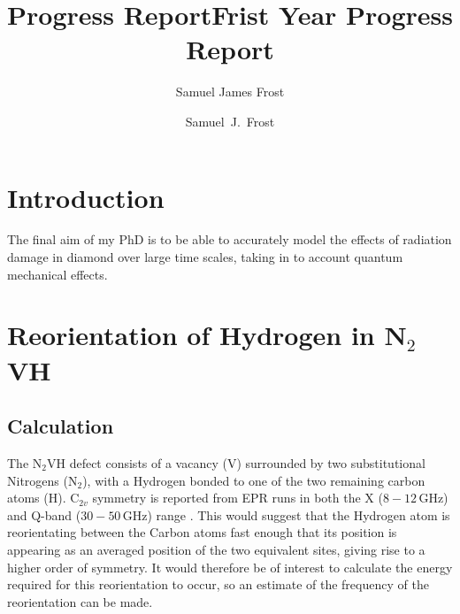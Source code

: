 \documentclass[10pt,a4paper,twocolumn,twoside]{extarticle}
\title{Progress Report}
\author{Samuel James Frost}
\title{Frist Year Progress Report}
\author{Samuel~J.~Frost}
\newcommand{\ntvh}{N$_2$VH }
\begin{document}
	\thispagestyle{empty}
	\tableofcontents

	
\section{Introduction}
The final aim of my PhD is to be able to accurately model the effects of radiation damage in diamond over large time scales, taking in to account quantum mechanical effects.

\section{Reorientation of Hydrogen in N$_2$VH}
\subsection{Calculation}
The \ntvh defect consists of a vacancy (V) surrounded by two substitutional Nitrogens (N$_2$), with a Hydrogen bonded to one of the two remaining carbon atoms (H). C$_{2v}$ symmetry is reported from EPR runs in both the X ($8-12$\,GHz) and Q-band ($30-50$\,GHz) range \cite{Hartland}. This would suggest that the Hydrogen atom is reorientating between the Carbon atoms fast enough that its position is appearing as an averaged position of the two equivalent sites, giving rise to a higher order of symmetry. It would therefore be of interest to calculate the energy required for this reorientation to occur, so an estimate of the frequency of the reorientation can be made. 
\end{document}
